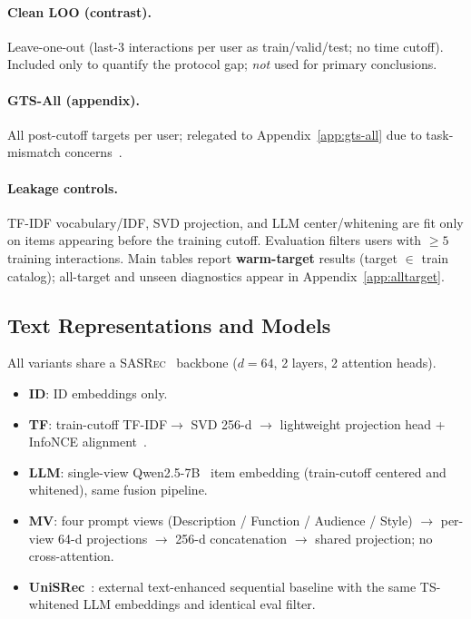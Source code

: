 \documentclass[sigconf,natbib=true,anonymous]{acmart}
\newcommand{\tfidf}{\textsc{TF-IDF}\xspace}
\newcommand{\base}{\textsc{SASRec}\xspace}
\begin{document}
\paragraph{Clean LOO (contrast).}
Leave-one-out (last-3 interactions per user as train/valid/test; no time cutoff).
Included only to quantify the protocol gap; \emph{not} used for primary conclusions.

\paragraph{GTS-All (appendix).}
All post-cutoff targets per user; relegated to Appendix~\ref{app:gts-all} due to task-mismatch concerns~\cite{liang2024timetosplit}.

\paragraph{Leakage controls.}
\tfidf vocabulary/IDF, SVD projection, and LLM center/whitening are fit only on items appearing before the training cutoff.
Evaluation filters users with $\ge 5$ training interactions.
Main tables report \textbf{warm-target} results (target $\in$ train catalog); all-target and unseen diagnostics appear in Appendix~\ref{app:alltarget}.

\subsection{Text Representations and Models}
\label{sec:models}

All variants share a \base~\cite{kang2018sasrec} backbone ($d{=}64$, 2 layers, 2 attention heads).

\begin{itemize}[leftmargin=*,itemsep=1pt]
\item \textbf{ID}: ID embeddings only.
\item \textbf{TF}: train-cutoff \tfidf $\to$ SVD 256-d $\to$ lightweight projection head + InfoNCE alignment~\cite{oord2018cpc}.
\item \textbf{LLM}: single-view Qwen2.5-7B~\cite{qwen2024qwen25} item embedding (train-cutoff centered and whitened), same fusion pipeline.
\item \textbf{MV}: four prompt views (Description / Function / Audience / Style) $\to$ per-view 64-d projections $\to$ 256-d concatenation $\to$ shared projection; no cross-attention.
\item \textbf{UniSRec}~\cite{hou2022unisrec}: external text-enhanced sequential baseline with the same TS-whitened LLM embeddings and identical eval filter.
\end{itemize}
\end{document}
